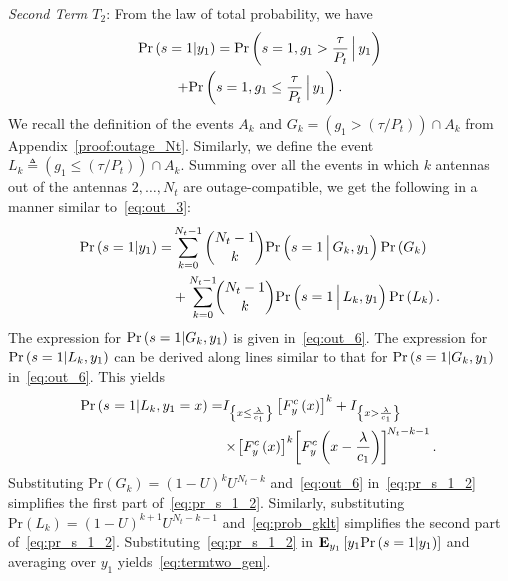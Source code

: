 \documentclass[journal]{IEEEtran}
\newcommand{\brac}[1]{\left({#1}\right)}
\newcommand{\cbrac}[1]{\left\{{#1}\right\}}
\newcommand{\indic}[1]{I_{\cbrac{#1}}}
\newcommand{\define}{\triangleq}
\newcommand{\explow}[2]{{\bf{E}}_{#1}\left[{#2}\right]}
\newcommand{\prob}[1]{\text{Pr}\brac{#1}}
\newcommand{\given}{\arrowvert}
\newcommand{\Given}{\Big\arrowvert}
\newcommand{\nck}[2]{\binom{#1}{#2}}
\newcommand{\setA}{A}
\newcommand{\setAk}{\setA_{k}}
\newcommand{\setG}{G}
\newcommand{\setL}{L}
\newcommand{\setGk}{\setG_k}
\newcommand{\setLk}{\setL_k}
\newcommand{\lam}{\lambda}
\newcommand{\s}[1][]{s_{#1}}
\newcommand{\termtwo}{T_2}
\newcommand{\Nt}{{N_t}}
\newcommand{\Pt}{{P_t}}
\newcommand{\puch}{g}
\newcommand{\gk}[1]{{\puch_{#1}}}
\newcommand{\itau}{\tau}
\newcommand{\cone}{c_{1}}
\newcommand{\taubypt}{\frac{\itau}{\Pt}}
\newcommand{\taubyptinl}{{\itau}/{\Pt}}
\newcommand{\gkgrtaubypt}[1]{{\gk{#1}}>\taubypt}
\newcommand{\gklttaubypt}[1]{{\gk{#1}}\leq\taubypt}
\newcommand{\gkgrtaubyptinl}[1]{{\gk{#1}}>\left( \taubyptinl \right) }
\newcommand{\gklttaubyptinl}[1]{{\gk{#1}}\leq\left( \taubyptinl \right) }
\newcommand{\lambycone}{\frac{\lam}{\cone}}
\newcommand{\yk}[1]{y_{#1}}
\newcommand{\un}{U}
\begin{document}
{\em Second Term $\termtwo$}: From the law of total probability, we have 
%
\begin{multline}
\prob{s = 1\given \yk{1}} = \prob{s = 1,\gkgrtaubypt{1}\Given\yk{1}} \\ + \prob{s = 1,\gklttaubypt{1}\Given \yk{1}}. 
\label{eq:pr_s_1}
\end{multline}
%
We recall  the definition of the events $\setAk$ and   $\setGk=\left(\gkgrtaubyptinl{1}\right)\cap\setAk$ from Appendix~\ref{proof:outage_Nt}. Similarly, we define the event $\setLk\define\left(\gklttaubyptinl{1}\right)\cap\setAk $. Summing over all the events in which $k$ antennas out of the antennas $2,\ldots,\Nt$ are outage-compatible, we get the following in a manner similar to~\eqref{eq:out_3}:
\begin{align}
\prob{s = 1\given \yk{1}}  =& \sum_{k=0}^{\Nt-1}\nck{\Nt-1}{k}
 \prob{s = 1 \Given \setGk, \yk{1}} \prob{\setGk}\nonumber \\
 &+ \sum_{k=0}^{\Nt-1}\!\!\nck{\Nt-1}{k} \prob{s = 1 \Given \setLk, \yk{1}} \prob{\setLk}. 
\label{eq:pr_s_1_2}
\end{align}
% 
%
The expression for $\prob{s = 1\given \setGk, \yk{1}}$ is given in~\eqref{eq:out_6}.  The expression for $\prob{s = 1\given \setLk, \yk{1}}$ can be derived along lines similar to that for $\prob{s = 1\given \setGk, \yk{1}}$ in~\eqref{eq:out_6}. This yields   
\begin{align}
\!\text{Pr}\brac{\s =1\given \setLk,\yk{1}=x} =&\indic{x\leq\lambycone} \left[ F_{y}^{c}\brac{x}\right]^{k} +\indic{x>\lambycone}\nonumber\\&\times\!\left[ F_{y}^{c}\brac{x}\right]^{k}\!\left[ F_{y}^{c}\brac{x-\lambycone}\right] ^{\!\Nt-k-1}.
\label{eq:prob_gklt}
\end{align}
%
Substituting $\prob{\setGk} = \left(1-\un\right)^k\un^{\Nt-k}$ and~\eqref{eq:out_6} in~\eqref{eq:pr_s_1_2} simplifies the first part of~\eqref{eq:pr_s_1_2}. Similarly, substituting $\prob{\setLk}=\left(1-\un\right)^{k+1}\un^{\Nt-k-1}$ and~\eqref{eq:prob_gklt} simplifies the second part of~\eqref{eq:pr_s_1_2}. Substituting~\eqref{eq:pr_s_1_2} in $\explow{\yk{1}}{ \yk{1}\prob{s = 1\given \yk{1}}}$ and averaging over $\yk{1}$ yields~\eqref{eq:termtwo_gen}. 
\end{document}
